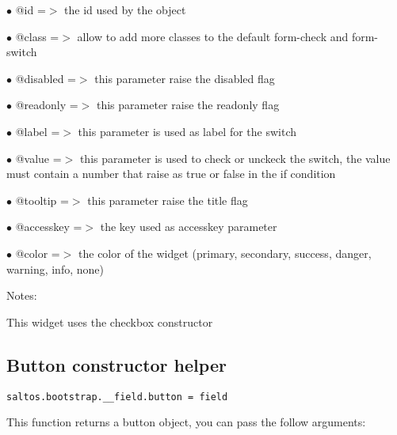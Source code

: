 \documentclass[a4paper]{book}
\begin{document}
\begin{compactitem}
\item[\color{myblue}$\bullet$] @id        =$>$ the id used by the object
\item[\color{myblue}$\bullet$] @class     =$>$ allow to add more classes to the default form-check and form-switch
\item[\color{myblue}$\bullet$] @disabled  =$>$ this parameter raise the disabled flag
\item[\color{myblue}$\bullet$] @readonly  =$>$ this parameter raise the readonly flag
\item[\color{myblue}$\bullet$] @label     =$>$ this parameter is used as label for the switch
\item[\color{myblue}$\bullet$] @value     =$>$ this parameter is used to check or unckeck the switch, the value
              must contain a number that raise as true or false in the if condition
\item[\color{myblue}$\bullet$] @tooltip   =$>$ this parameter raise the title flag
\item[\color{myblue}$\bullet$] @accesskey =$>$ the key used as accesskey parameter
\item[\color{myblue}$\bullet$] @color     =$>$ the color of the widget (primary, secondary, success, danger, warning, info, none)
\end{compactitem}

Notes:

This widget uses the checkbox constructor

\hypertarget{toc476}{}
\subsection{Button constructor helper}

\begin{lstlisting}
saltos.bootstrap.__field.button = field
\end{lstlisting}

This function returns a button object, you can pass the follow arguments:
\end{document}
